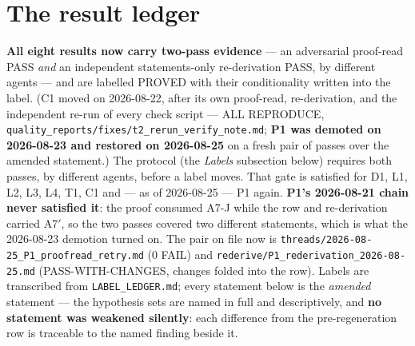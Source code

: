 \documentclass[11pt,a4paper]{article}
\begin{document}
\section{The result ledger}

\textbf{All eight results now carry two-pass evidence} --- an adversarial proof-read
PASS \emph{and} an independent statements-only re-derivation PASS, by different agents
--- and are labelled PROVED with their conditionality written into the label. (C1 moved
on 2026-08-22, after its own proof-read, re-derivation, and the independent re-run of
every check script --- ALL REPRODUCE,
\texttt{quality\_reports/fixes/t2\_rerun\_verify\_note.md}; \textbf{P1 was demoted on
2026-08-23 and restored on 2026-08-25} on a fresh pair of passes over the amended
statement.) The protocol (the \emph{Labels} subsection below) requires both passes, by
different agents, before a label moves. That gate is satisfied for D1, L1, L2, L3, L4,
T1, C1 and --- as of 2026-08-25 --- P1 again. \textbf{P1's 2026-08-21 chain never
satisfied it}: the proof consumed A7-J while the row and re-derivation carried A7$'$, so
the two passes covered two different statements, which is what the 2026-08-23 demotion
turned on. The pair on file now is
\texttt{threads/2026-08-25\_P1\_proofread\_retry.md} (0 FAIL) and
\texttt{rederive/P1\_rederivation\_2026-08-25.md} (PASS-WITH-CHANGES, changes folded into
the row). Labels are transcribed from \texttt{LABEL\_LEDGER.md}; every statement below is
the \emph{amended} statement --- the hypothesis sets are named in full and descriptively,
and \textbf{no statement was weakened silently}: each difference from the
pre-regeneration row is traceable to the named finding beside it.
\end{document}
